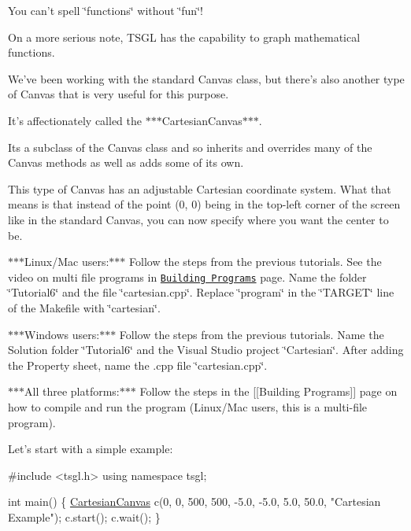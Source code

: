 You can't spell \char`\"{}functions\char`\"{} without \char`\"{}fun\char`\"{}!

On a more serious note, T\-S\-G\-L has the capability to graph mathematical functions.

We've been working with the standard Canvas class, but there's also another type of Canvas that is very useful for this purpose.

It's affectionately called the $\ast$$\ast$$\ast$\-Cartesian\-Canvas$\ast$$\ast$$\ast$.

Its a subclass of the Canvas class and so inherits and overrides many of the Canvas methods as well as adds some of its own.

This type of Canvas has an adjustable Cartesian coordinate system. What that means is that instead of the point {\ttfamily (0, 0)} being in the top-\/left corner of the screen like in the standard Canvas, you can now specify where you want the center to be.

$\ast$$\ast$$\ast$\-Linux/\-Mac users\-:$\ast$$\ast$$\ast$ Follow the steps from the previous tutorials. See the video on multi file programs in \href{https://github.com/Calvin-CS/TSGL/wiki/Building-Programs}{\tt Building Programs} page. Name the folder \char`\"{}\-Tutorial6\char`\"{} and the file \char`\"{}cartesian.\-cpp\char`\"{}. Replace \char`\"{}program\char`\"{} in the \char`\"{}\-T\-A\-R\-G\-E\-T\char`\"{} line of the Makefile with \char`\"{}cartesian\char`\"{}.

$\ast$$\ast$$\ast$\-Windows users\-:$\ast$$\ast$$\ast$ Follow the steps from the previous tutorials. Name the Solution folder \char`\"{}\-Tutorial6\char`\"{} and the Visual Studio project \char`\"{}\-Cartesian\char`\"{}. After adding the Property sheet, name the .cpp file \char`\"{}cartesian.\-cpp\char`\"{}.

$\ast$$\ast$$\ast$\-All three platforms\-:$\ast$$\ast$$\ast$ Follow the steps in the \mbox{[}\mbox{[}Building Programs\mbox{]}\mbox{]} page on how to compile and run the program (Linux/\-Mac users, this is a multi-\/file program).

Let's start with a simple example\-:


\begin{DoxyCode}
\textcolor{preprocessor}{#include <tsgl.h>}
\textcolor{keyword}{using namespace }tsgl;

\textcolor{keywordtype}{int} main() \{
  \hyperlink{classtsgl_1_1_cartesian_canvas}{CartesianCanvas} c(0, 0, 500, 500, -5.0, -5.0, 5.0, 50.0, \textcolor{stringliteral}{"Cartesian Example"});
  c.start();
  c.wait();
\}
\end{DoxyCode}


